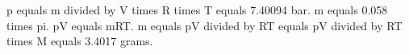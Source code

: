 p equals m divided by V times R times T equals 7.40094 bar.  
m equals 0.058 times pi.  
pV equals mRT.  
m equals pV divided by RT equals pV divided by RT times M equals 3.4017 grams.